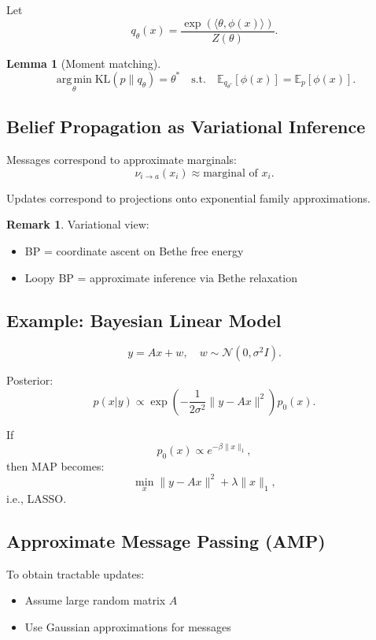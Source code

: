 \documentclass[12pt,oneside]{book}
\numberwithin{equation}{section}
\theoremstyle{definition}
\newtheorem{remark}{Remark}[section]
\theoremstyle{plain}
\newtheorem{lemma}{Lemma}[section]
\theoremstyle{remark}
\newcommand{\E}{\mathbb{E}}
\newcommand{\argmin}{\operatorname*{arg\,min}}
\newcommand{\Normal}{\mathcal{N}}
\begin{document}
Let
\[
q_\theta(x) = \frac{\exp(\langle \theta, \phi(x)\rangle)}{Z(\theta)}.
\]

\begin{lemma}[Moment matching]
\[
\argmin_\theta \mathrm{KL}(p \| q_\theta)
=
\theta^*
\quad \text{s.t.} \quad
\E_{q_{\theta^*}}[\phi(x)] = \E_p[\phi(x)].
\]
\end{lemma}

\subsection{Belief Propagation as Variational Inference}

Messages correspond to approximate marginals:
\[
\nu_{i \to a}(x_i)
\approx
\text{marginal of } x_i.
\]

Updates correspond to projections onto exponential family approximations.

\begin{remark}
Variational view:
\begin{itemize}
    \item BP = coordinate ascent on Bethe free energy
    \item Loopy BP = approximate inference via Bethe relaxation
\end{itemize}
\end{remark}

\subsection{Example: Bayesian Linear Model}

\[
y = Ax + w, \quad w \sim \Normal(0, \sigma^2 I).
\]

Posterior:
\[
p(x|y) \propto \exp\left(-\frac{1}{2\sigma^2}\|y - Ax\|^2\right) p_0(x).
\]

If
\[
p_0(x) \propto e^{-\beta \|x\|_1},
\]
then MAP becomes:
\[
\min_x \|y - Ax\|^2 + \lambda \|x\|_1,
\]
i.e., LASSO.

\subsection{Approximate Message Passing (AMP)}

To obtain tractable updates:

\begin{itemize}
    \item Assume large random matrix $A$
    \item Use Gaussian approximations for messages
\end{itemize}
\end{document}
